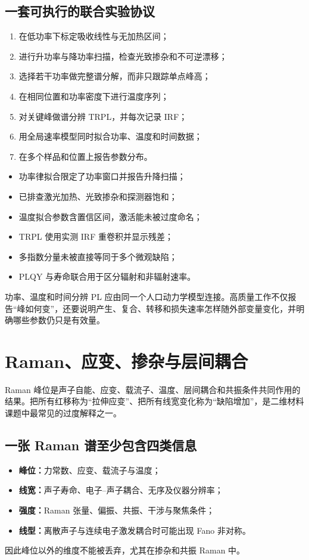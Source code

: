 \documentclass[11pt,a4paper,openany,fontset=fandol]{ctexbook}
\newcommand{\tickitem}{\item[$\square$]}
\begin{document}
\section{一套可执行的联合实验协议}

\begin{enumerate}
\item 在低功率下标定吸收线性与无加热区间；
\item 进行升功率与降功率扫描，检查光致掺杂和不可逆漂移；
\item 选择若干功率做完整谱分解，而非只跟踪单点峰高；
\item 在相同位置和功率密度下进行温度序列；
\item 对关键峰做谱分辨 TRPL，并每次记录 IRF；
\item 用全局速率模型同时拟合功率、温度和时间数据；
\item 在多个样品和位置上报告参数分布。
\end{enumerate}

\begin{checkbox}
\begin{itemize}
\tickitem 功率律拟合限定了功率窗口并报告升降扫描；
\tickitem 已排查激光加热、光致掺杂和探测器饱和；
\tickitem 温度拟合参数含置信区间，激活能未被过度命名；
\tickitem TRPL 使用实测 IRF 重卷积并显示残差；
\tickitem 多指数分量未被直接等同于多个微观缺陷；
\tickitem PLQY 与寿命联合用于区分辐射和非辐射速率。
\end{itemize}
\end{checkbox}

\begin{conclusionbox}
功率、温度和时间分辨 PL 应由同一个人口动力学模型连接。高质量工作不仅报告“峰如何变”，还要说明产生、复合、转移和损失速率怎样随外部变量变化，并明确哪些参数仍只是有效量。
\end{conclusionbox}

\chapter{Raman、应变、掺杂与层间耦合}

Raman 峰位是声子自能、应变、载流子、温度、层间耦合和共振条件共同作用的结果。把所有红移称为“拉伸应变”、把所有线宽变化称为“缺陷增加”，是二维材料课题中最常见的过度解释之一。

\section{一张 Raman 谱至少包含四类信息}

\begin{itemize}
\item \textbf{峰位：}力常数、应变、载流子与温度；
\item \textbf{线宽：}声子寿命、电子--声子耦合、无序及仪器分辨率；
\item \textbf{强度：}Raman 张量、偏振、共振、干涉与聚焦条件；
\item \textbf{线型：}离散声子与连续电子激发耦合时可能出现 Fano 非对称。
\end{itemize}
因此峰位以外的维度不能被丢弃，尤其在掺杂和共振 Raman 中。
\end{document}
